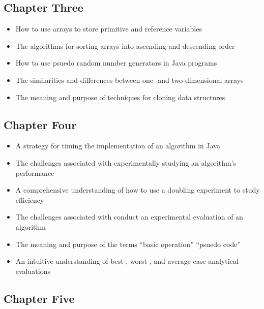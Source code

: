 \documentclass[11pt]{article}
\begin{document}
\vspace*{-.2in}
\subsection*{Chapter Three}

\begin{itemize}

  \itemsep 0in

  \item How to use arrays to store primitive and reference variables
  \item The algorithms for sorting arrays into ascending and descending order
  \item How to use psuedo random number generators in Java programs
  \item The similarities and differences between one- and two-dimensional arrays
  \item The meaning and purpose of techniques for cloning data structures

\end{itemize}

\vspace*{-.2in}
\subsection*{Chapter Four}

\begin{itemize}

  \itemsep 0in

  \item A strategy for timing the implementation of an algorithm in Java
  \item The challenges associated with experimentally studying an algorithm's
    performance
  \item A comprehensive understanding of how to use a doubling experiment to
    study efficiency
  \item The challenges associated with conduct an experimental evaluation of an
    algorithm
  \item The meaning and purpose of the terms ``basic operation'' ``psuedo code''
  \item An intuitive understanding of best-, worst-, and average-case analytical
    evaluations

\end{itemize}

\vspace*{-.2in}
\subsection*{Chapter Five}
\end{document}
